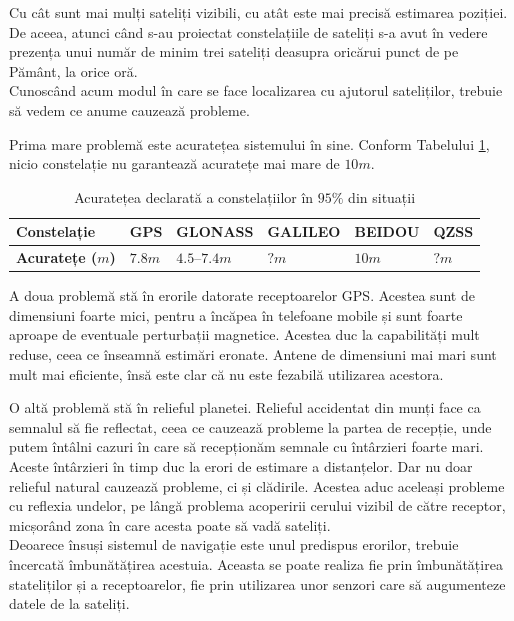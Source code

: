 \documentclass[12pt, a4paper, oneside]{article}
\begin{document}
Cu cât sunt mai mulți sateliți vizibili, cu atât este mai precisă estimarea poziției. De aceea, atunci când s-au proiectat constelațiile de sateliți s-a avut în vedere prezența unui număr de minim trei sateliți deasupra oricărui punct de pe Pământ, la orice oră.\\

Cunoscând acum modul în care se face localizarea cu ajutorul sateliților, trebuie să vedem ce anume cauzează probleme.

Prima mare problemă este acuratețea sistemului în sine. Conform Tabelului \ref{tab:accuracy_table}, nicio constelație nu garantează acuratețe mai mare de $10m$.

\begin{table}[h]
\centering
    \begin{tabular}{ | l | l | l | l | l | l |}
    \hline
    \textbf{Constelație} & GPS & GLONASS & GALILEO & BEIDOU & QZSS \\ \hline
    \textbf{Acuratețe ($m$)} & $7.8m$ \cite{GPSAccuracy} & $ 4.5–7.4m$ \cite{GLONASSAccuracy} & $?m$ & $10m$ \cite{BeiDouAccuracy} & $?m$ \\ \hline
    \end{tabular}
    
    \caption{Acuratețea declarată a constelațiilor în $95\%$ din situații}
    \label{tab:accuracy_table}
\end{table}

A doua problemă stă în erorile datorate receptoarelor GPS. Acestea sunt de dimensiuni foarte mici, pentru a încăpea în telefoane mobile și sunt foarte aproape de eventuale perturbații magnetice. Acestea duc la capabilități mult reduse, ceea ce înseamnă estimări eronate. Antene de dimensiuni mai mari sunt mult mai eficiente, însă este clar că nu este fezabilă utilizarea acestora.

O altă problemă stă în relieful planetei. Relieful accidentat din munți face ca semnalul să fie reflectat, ceea ce cauzează probleme la partea de recepție, unde putem întâlni cazuri în care să recepționăm semnale cu întârzieri foarte mari. Aceste întârzieri în timp duc la erori de estimare a distanțelor. Dar nu doar relieful natural cauzează probleme, ci și clădirile. Acestea aduc aceleași probleme cu reflexia undelor, pe lângă problema acoperirii cerului vizibil de către receptor, micșorând zona în care acesta poate să vadă sateliți.\\

Deoarece însuși sistemul de navigație este unul predispus erorilor, trebuie încercată îmbunătățirea acestuia. Aceasta se poate realiza fie prin îmbunătățirea stateliților și a receptoarelor, fie prin utilizarea unor senzori care să augumenteze datele de la sateliți.
\end{document}
